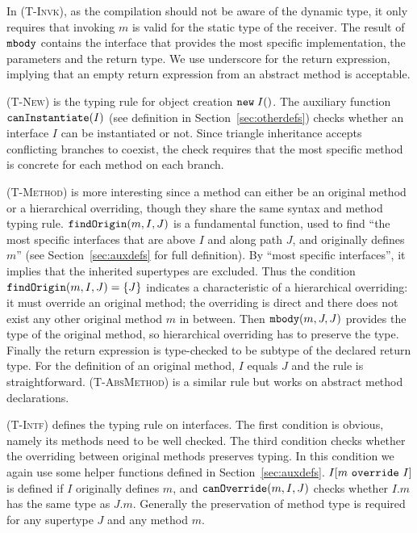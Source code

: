 In \textsc{(T-Invk)}, as the compilation should not be aware
of the dynamic type, it only requires that invoking $m$ is valid for the static type of the
receiver. The result of $\texttt{mbody}$ contains the interface that provides the most specific implementation,
the parameters and the return type. We use underscore for the return expression, implying that an empty return expression
from an abstract method is acceptable.

\textsc{(T-New)} is the typing rule for object creation $\texttt{new} \; I()$. The
auxiliary function $\texttt{canInstantiate}(I)$ (see definition in Section~\ref{sec:otherdefs}) checks whether an interface $I$ 
can be instantiated or not. Since triangle inheritance accepts conflicting branches to coexist, the check requires that the most specific method is concrete for each method on each branch.

\textsc{(T-Method)} is more interesting since a method can either be an original method or a hierarchical overriding, though
they share the same syntax and method typing rule. $\texttt{findOrigin}(m, I, J)$ is a fundamental function,
used to find ``the most specific interfaces that are above $I$ and
along path $J$, and originally defines $m$'' (see
Section~\ref{sec:auxdefs} for full definition).
By ``most specific interfaces'',
it implies that the inherited supertypes are excluded. Thus the condition $\texttt{findOrigin}(m, I, J) = \{J\}$ indicates a characteristic of a hierarchical overriding: it must override an original method; the overriding is direct and there does not exist any other original method $m$ in between.
Then $\texttt{mbody}(m, J, J)$ provides the type of the original method, so hierarchical overriding has to preserve the type. Finally the return expression
is type-checked to be subtype of the declared return type. For the definition of an original method, $I$ equals $J$ and the rule is straightforward. \textsc{(T-AbsMethod)} is a similar rule but works on abstract method declarations.

\textsc{(T-Intf)} defines the typing rule on interfaces. The first condition is obvious, namely its methods need to be well checked. The third
condition checks whether the overriding between original methods preserves typing. In this condition we again use some helper functions defined in  Section~\ref{sec:auxdefs}. $I[m\ \texttt{override}\ I]$ is defined if $I$ originally defines $m$, and $\texttt{canOverride}(m, I, J)$ checks whether $I.m$ has the same type as $J.m$. Generally the preservation of method type is required for any supertype $J$ and any method $m$.

